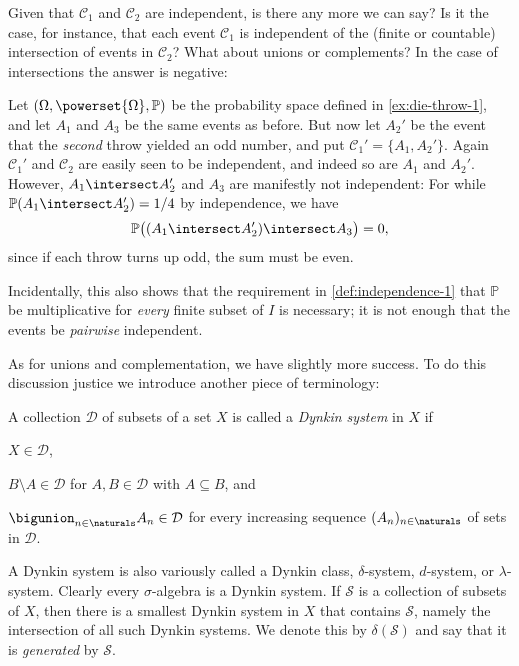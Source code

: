 \documentclass[article, a4paper, 11pt, oneside]{memoir}
\numberwithin{equation}{chapter}
\newcommand{\calC}{\mathcal{C}}
\newcommand{\calD}{\mathcal{D}}
\newcommand{\calS}{\mathcal{S}}
\renewcommand{\P}{\mathbb{P}}
\begin{document}
Given that $\calC_1$ and $\calC_2$ are independent, is there any more we can say? Is it the case, for instance, that each event $\calC_1$ is independent of the (finite or countable) intersection of events in $\calC_2$? What about unions or complements? In the case of intersections the answer is negative:

\begin{example}
    \label{ex:die-throw-2}
    Let $(\Omega,\powerset{\Omega},\P)$ be the probability space defined in \cref{ex:die-throw-1}, and let $A_1$ and $A_3$ be the same events as before. But now let $A_2'$ be the event that the \emph{second} throw yielded an odd number, and put $\calC_1' = \{A_1, A_2'\}$. Again $\calC_1'$ and $\calC_2$ are easily seen to be independent, and indeed so are $A_1$ and $A_2'$. However, $A_1 \intersect A_2'$ and $A_3$ are manifestly not independent: For while $\P(A_1 \intersect A_2') = 1/4$ by independence, we have
    \begin{equation*}
        \P \bigl( (A_1 \intersect A_2') \intersect A_3 \bigr)
            = 0,
    \end{equation*}
    since if each throw turns up odd, the sum must be even.

    Incidentally, this also shows that the requirement in \cref{def:independence-1} that $\P$ be multiplicative for \emph{every} finite subset of $I$ is necessary; it is not enough that the events be \emph{pairwise} independent.
\end{example}

As for unions and complementation, we have slightly more success. To do this discussion justice we introduce another piece of terminology:

\begin{definition}
    A collection $\calD$ of subsets of a set $X$ is called a \emph{Dynkin system} in $X$ if
    \begin{enumdef}
        \item $X \in \calD$,
        \item $B \setminus A \in \calD$ for $A,B \in \calD$ with $A \subseteq B$, and
        \item $\bigunion_{n\in\naturals} A_n \in \calD$ for every increasing sequence $(A_n)_{n\in\naturals}$ of sets in $\calD$.
    \end{enumdef}
\end{definition}
%
A Dynkin system is also variously called a Dynkin class, $\delta$-system, $d$-system, or $\lambda$-system. Clearly every $\sigma$-algebra is a Dynkin system. If $\calS$ is a collection of subsets of $X$, then there is a smallest Dynkin system in $X$ that contains $\calS$, namely the intersection of all such Dynkin systems. We denote this by $\delta(\calS)$ and say that it is \emph{generated} by $\calS$.
\end{document}
